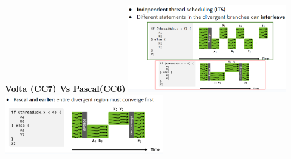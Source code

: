 \documentclass[10pt, landscape]{article}
\begin{document}
\begin{multicols}{4}
\textbf{Volta (CC7) Vs Pascal(CC6)}
\includegraphics*[width=7cm]{volta.png}
\includegraphics*[width=7cm]{pascal.png}



\end{multicols}
\end{document}
